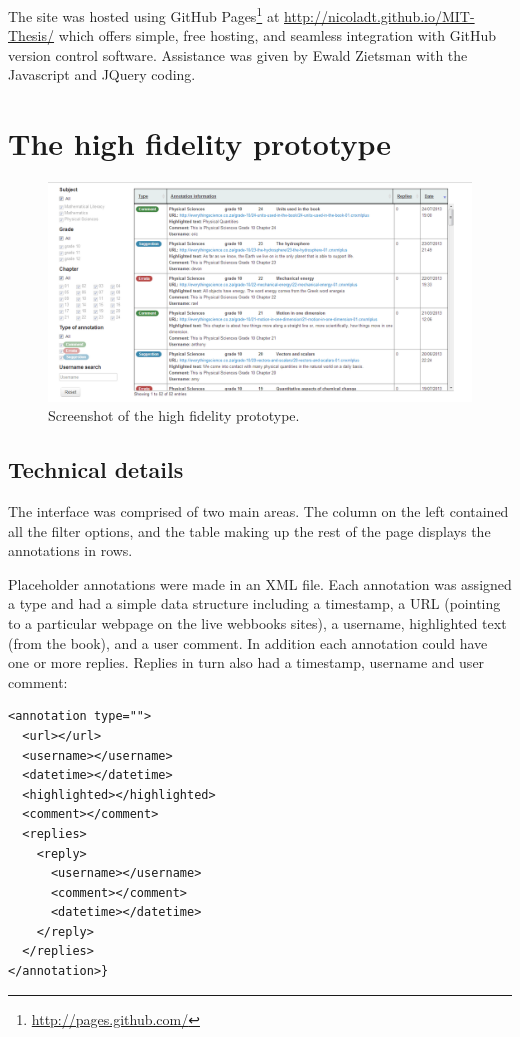 The site was hosted using GitHub Pages\footnote{\href{http://pages.github.com/}{ http://pages.github.com/}} at \href{http://nicoladt.github.io/MIT-Thesis/}{http://nicoladt.github.io/MIT-Thesis/} which offers simple, free hosting, and seamless integration with GitHub version control software. Assistance was given by Ewald Zietsman with the Javascript and JQuery coding. 

\section{The high fidelity prototype}
\begin{figure}[h!]
    \centering
    \includegraphics[width=\textwidth]{Figures/V1/HiFi1mainview.PNG}
 \caption{Screenshot of the high fidelity prototype.	}
 \label{fig:HifiMain}
\end{figure}

\subsection{Technical details}
The interface was comprised of two main areas. The column on the left contained all the filter options, and the table making up the rest of the page displays the annotations in rows.

Placeholder annotations were made in an XML file. Each annotation was assigned a type and had a simple data structure including a timestamp, a URL (pointing to a particular webpage on the live webbooks sites), a username, highlighted text (from the book), and a user comment. In addition each annotation could have one or more replies. Replies in turn also had a timestamp, username and user comment: 
\begin{verbatim}
<annotation type="">
  <url></url>
  <username></username>
  <datetime></datetime>
  <highlighted></highlighted>
  <comment></comment>
  <replies>
    <reply>
      <username></username>
      <comment></comment>
      <datetime></datetime>
    </reply>
  </replies>
</annotation>}
\end{verbatim}


